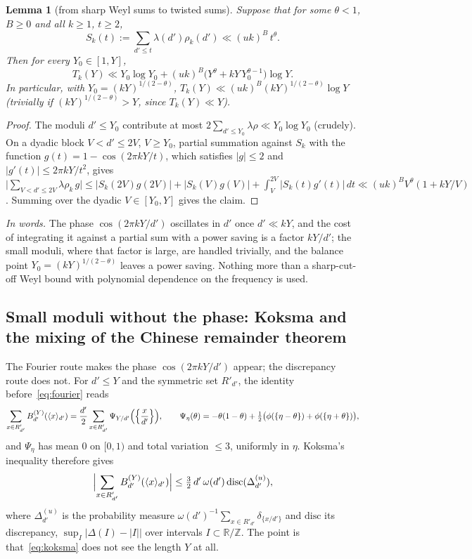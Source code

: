 \documentclass[11pt,a4paper]{article}
\newtheorem{lemma}[theorem]{Lemma}
\theoremstyle{remark}\newtheorem{remark}[theorem]{Remark}
\newcommand{\Z}{\mathbb{Z}}\newcommand{\Q}{\mathbb{Q}}\newcommand{\F}{\mathbb{F}}\newcommand{\R}{\mathbb{R}}
\newcommand{\rep}[2]{\langle #1\rangle_{#2}}
\begin{document}
\begin{lemma}[from sharp Weyl sums to twisted sums]\label{lem:partial}
Suppose that for some $\theta<1$, $B\ge0$ and all $k\ge1$, $t\ge2$,
\begin{equation}\label{eq:W}
S_k(t):=\sum_{d'\le t}\lambda(d')\rho_k(d')\ll(uk)^{B}\,t^{\theta}.
\end{equation}
Then for every $Y_0\in[1,Y]$,
\[
T_k(Y)\ll Y_0\log Y_0+(uk)^B\bigl(Y^\theta+kY\,Y_0^{\theta-1}\bigr)\log Y .
\]
In particular, with $Y_0=(kY)^{1/(2-\theta)}$, $T_k(Y)\ll(uk)^B(kY)^{1/(2-\theta)}\log Y$ (trivially if $(kY)^{1/(2-\theta)}>Y$, since $T_k(Y)\ll Y$).
\end{lemma}
\begin{proof}
The moduli $d'\le Y_0$ contribute at most $2\sum_{d'\le Y_0}\lambda\rho\ll Y_0\log Y_0$ (crudely). On a dyadic block
$V<d'\le2V$, $V\ge Y_0$, partial summation against $S_k$ with the function $g(t)=1-\cos(2\pi kY/t)$, which satisfies
$|g|\le2$ and $|g'(t)|\le2\pi kY/t^2$, gives
$\bigl|\sum_{V<d'\le2V}\lambda\rho_k\,g\bigr|\le|S_k(2V)g(2V)|+|S_k(V)g(V)|+\int_V^{2V}|S_k(t)g'(t)|\,dt\ll(uk)^BV^\theta(1+kY/V)$.
Summing over the dyadic $V\in[Y_0,Y]$ gives the claim.
\end{proof}

\emph{In words.} The phase $\cos(2\pi kY/d')$ oscillates in $d'$ once $d'\ll kY$, and the cost of integrating
it against a partial sum with a power saving is a factor $kY/d'$; the small moduli, where that factor is large,
are handled trivially, and the balance point $Y_0=(kY)^{1/(2-\theta)}$ leaves a power saving. Nothing more than a
sharp-cut-off Weyl bound with polynomial dependence on the frequency is used.

\subsection{Small moduli without the phase: Koksma and the mixing of the Chinese remainder theorem}\label{sec:koksma}

The Fourier route makes the phase $\cos(2\pi kY/d')$ appear; the discrepancy route does not. For $d'\le Y$ and
the symmetric set $R'_{d'}$, the identity before~\eqref{eq:fourier} reads
\[
\sum_{x\in R'_{d'}}B^{(Y)}_{d'}(\rep x{d'})=\frac{d'}2\sum_{x\in R'_{d'}}\Psi_{Y/d'}\Bigl(\Bigl\{\frac x{d'}\Bigr\}\Bigr),\qquad
\Psi_\eta(\theta)=-\theta(1-\theta)+\tfrac12\bigl(\phi(\{\eta-\theta\})+\phi(\{\eta+\theta\})\bigr),
\]
and $\Psi_\eta$ has mean $0$ on $[0,1)$ and total variation $\le3$, uniformly in $\eta$. Koksma's inequality
therefore gives
\begin{equation}\label{eq:koksma}
\Bigl|\sum_{x\in R'_{d'}}B^{(Y)}_{d'}(\rep x{d'})\Bigr|\le\tfrac32\,d'\,\omega(d')\,\mathrm{disc}(\Delta^{(u)}_{d'}),
\end{equation}
where $\Delta^{(u)}_{d'}$ is the probability measure $\omega(d')^{-1}\sum_{x\in R'_{d'}}\delta_{\{x/d'\}}$ and $\mathrm{disc}$ its
discrepancy, $\sup_I|\Delta(I)-|I||$ over intervals $I\subset\R/\Z$. The point is that~\eqref{eq:koksma} does not
see the length $Y$ at all.
\end{document}
